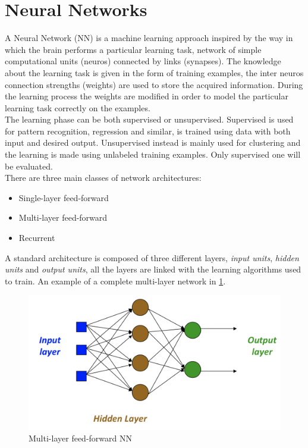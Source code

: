 \documentclass[%
    corpo=12pt,
    twoside,
    oldstyle,
    autoretitolo,
    greek,
    evenboxes,
]{toptesi}
\begin{document}
\section{Neural Networks}
A Neural Network (NN) is a machine learning approach inspired by the way in which the brain performs a particular learning task, network of simple computational units (neuros) connected by links (synapses). The knowledge about the learning task is given in the form of training examples, the inter neuros connection strengths (weights) are used to store the acquired information. During the learning process the weights are modified in order to model the particular learning task correctly on the examples.\\
The learning phase can be both supervised or unsupervised. Supervised is used for pattern recognition, regression and similar, is trained using data with both input and desired output. Unsupervised instead is mainly used for clustering and the learning is made using unlabeled training examples. Only supervised one will be evaluated.\\
There are three main classes of network architectures:
\begin{itemize}
  \item Single-layer feed-forward
  \item Multi-layer feed-forward
  \item Recurrent
\end{itemize}
A standard architecture is composed of three different layers, \textit{input units}, \textit{hidden units} and \textit{output units}, all the layers are linked with the learning algorithms used to train. An example of a complete multi-layer network in \ref{fig:mlff}.

\begin{figure}[!ht]
  \includegraphics[width=\linewidth]{figure/feed_foward.png}
  \caption{Multi-layer feed-forward NN}
  \label{fig:mlff}
\end{figure}
\end{document}
